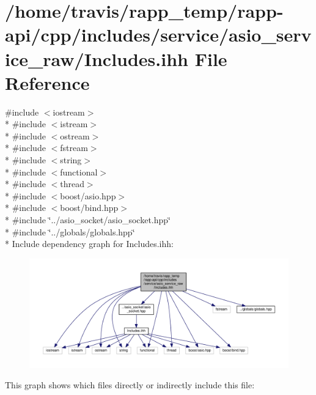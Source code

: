 \hypertarget{service_2asio__service__raw_2Includes_8ihh}{\section{/home/travis/rapp\-\_\-temp/rapp-\/api/cpp/includes/service/asio\-\_\-service\-\_\-raw/\-Includes.ihh File Reference}
\label{service_2asio__service__raw_2Includes_8ihh}
}
{\ttfamily \#include $<$iostream$>$}\\*
{\ttfamily \#include $<$istream$>$}\\*
{\ttfamily \#include $<$ostream$>$}\\*
{\ttfamily \#include $<$fstream$>$}\\*
{\ttfamily \#include $<$string$>$}\\*
{\ttfamily \#include $<$functional$>$}\\*
{\ttfamily \#include $<$thread$>$}\\*
{\ttfamily \#include $<$boost/asio.\-hpp$>$}\\*
{\ttfamily \#include $<$boost/bind.\-hpp$>$}\\*
{\ttfamily \#include \char`\"{}../asio\-\_\-socket/asio\-\_\-socket.\-hpp\char`\"{}}\\*
{\ttfamily \#include \char`\"{}../globals/globals.\-hpp\char`\"{}}\\*
Include dependency graph for Includes.\-ihh\-:
\nopagebreak
\begin{figure}[H]
\begin{center}
\leavevmode
\includegraphics[width=350pt]{service_2asio__service__raw_2Includes_8ihh__incl}
\end{center}
\end{figure}
This graph shows which files directly or indirectly include this file\-:
\nopagebreak
